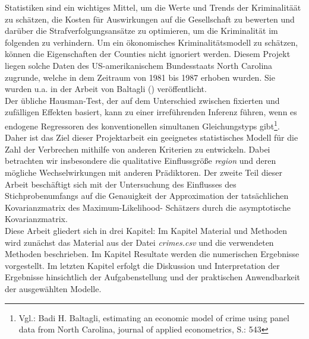 Statistiken sind ein wichtiges Mittel, um die Werte und Trends der Kriminalitä\"at zu schätzen, die Kosten f\"ur Auswirkungen auf die Gesellschaft zu bewerten und dar\"uber die Strafverfolgungsans\"atze zu optimieren, um die Kriminalit\"at im folgenden zu verhindern. 
Um ein \"okonomisches Kriminalit\"atsmodell zu sch\"atzen, k\"onnen die Eigenschaften der Counties nicht ignoriert werden. Diesem Projekt liegen solche Daten des US-amerikanischem Bundesstaats North Carolina zugrunde, welche in dem Zeitraum von 1981 bis 1987 erhoben wurden. Sie wurden u.a. in der Arbeit von Baltagli
(\citep{baltagli:1}) ver\"offentlicht. \\
 
Der \"ubliche Hausman-Test, der auf dem Unterschied zwischen fixierten und zuf\"alligen Effekten basiert, kann zu einer irref\"uhrenden Inferenz f\"uhren, wenn es endogene Regressoren des konventionellen simultanen Gleichungstyps gibt\footnote{Vgl.: Badi H. Baltagli, estimating an economic model of crime using panel data from North Carolina, journal of applied econometrics, S.: 543}.
Daher ist das Ziel dieser Projektarbeit ein geeignetes statistisches Modell f\"ur die Zahl der Verbrechen mithilfe von anderen Kriterien zu entwickeln. Dabei betrachten wir insbesondere die qualitative Einflussgr\"o\ss{}e \textit{region} und deren m\"ogliche Wechselwirkungen mit anderen Pr\"adiktoren. 
Der zweite Teil dieser Arbeit besch\"aftigt sich mit der Untersuchung des Einflusses des Stichprobenumfangs auf die Genauigkeit der Approximation der tats\"achlichen Kovarianzmatrix des Maximum-Likelihood-
Sch\"atzers durch die asymptotische Kovarianzmatrix. \\

Diese Arbeit gliedert sich in drei Kapitel: Im Kapitel Material und Methoden wird zun\"achst das Material aus der Datei \textit{crimes.csv} und die verwendeten Methoden beschrieben. Im Kapitel Resultate werden die numerischen Ergebnisse vorgestellt. Im letzten Kapitel erfolgt die Diskussion und Interpretation der Ergebnisse hinsichtlich der Aufgabenstellung und der praktischen Anwendbarkeit der ausgew\"ahlten Modelle.